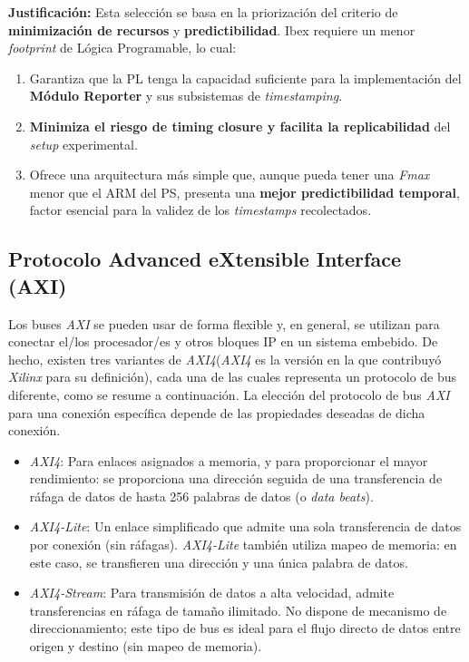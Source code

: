 \textbf{Justificación:} Esta selección se basa en la priorización del criterio de \textbf{minimización de recursos} y \textbf{predictibilidad}. Ibex requiere un menor \textit{footprint} de Lógica Programable, lo cual:

\begin{enumerate}
    \item Garantiza que la PL tenga la capacidad suficiente para la implementación del \textbf{Módulo Reporter} y sus subsistemas de \textit{timestamping}.
    \item \textbf{Minimiza el riesgo de \textbf{timing closure} y facilita la replicabilidad} del \textit{setup} experimental.
    \item Ofrece una arquitectura más simple que, aunque pueda tener una \textit{Fmax} menor que el ARM del PS, presenta una \textbf{mejor predictibilidad temporal}, factor esencial para la validez de los \textit{timestamps} recolectados.
\end{enumerate}


\subsection{Protocolo Advanced eXtensible Interface (AXI)}
\label{ssec:protocolo_axi}
Los buses \textit{AXI} se pueden usar de forma flexible y, en general, se utilizan para conectar el/los procesador/es y otros bloques IP en un sistema embebido. De hecho, existen tres variantes de \textit{AXI4}(\textit{AXI4} es la versión en la que contribuyó \textit{Xilinx} para su definición), cada una de las cuales representa un protocolo de bus diferente, como se resume a continuación. La elección del protocolo de bus \textit{AXI} para una conexión específica depende de las propiedades deseadas de dicha conexión.

\begin{itemize}
    \item \textit{AXI4}: Para enlaces asignados a memoria, y para proporcionar el mayor rendimiento: se proporciona una dirección seguida de una transferencia de ráfaga de datos de hasta 256 palabras de datos (o \textit{data beats}).

    \item \textit{AXI4-Lite}: Un enlace simplificado que admite una sola transferencia de datos por conexión (sin ráfagas). \textit{AXI4-Lite} también utiliza mapeo de memoria: en este caso, se transfieren una dirección y una única palabra de datos.
    
    \item \textit{AXI4-Stream}: Para transmisión de datos a alta velocidad, admite transferencias en ráfaga de tamaño ilimitado. No dispone de mecanismo de direccionamiento; este tipo de bus es ideal para el flujo directo de datos entre origen y destino (sin mapeo de memoria).
\end{itemize}

